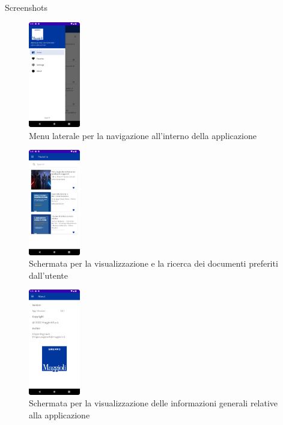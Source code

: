 \documentclass[10pt]{beamer}
\begin{document}
    \begin{frame}{Screenshots}
        \begin{multicols}{3}
            \begin{figure}[H]
                \includegraphics[width=0.2\textwidth]{sidenav.png}
                \caption{Menu laterale per la navigazione all'interno della applicazione}
                \label{sidenav}
            \end{figure}
            
            \begin{figure}[H]
                \includegraphics[width=0.2\textwidth]{preferiti.png}
                \caption{Schermata per la visualizzazione e la ricerca dei documenti preferiti dall'utente}
                \label{preferiti}
            \end{figure}

            \begin{figure}[H]
                \includegraphics[width=0.2\textwidth]{about.png}
                \caption{Schermata per la visualizzazione delle informazioni generali relative alla applicazione}
                \label{about}
            \end{figure}
        \end{multicols}
    \end{frame}
\end{document}
